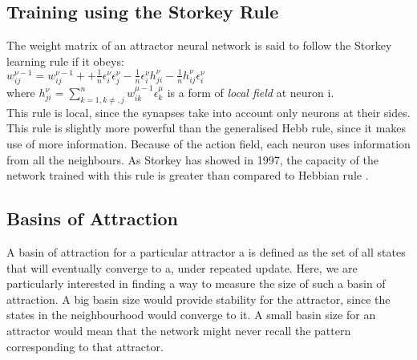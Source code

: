 \subsection{Training using the Storkey Rule}

The weight matrix of an attractor neural network is said to follow the Storkey learning rule if it obeys:\\

\( w_{ij}^{\nu-1} = w_{ij}^{\nu-1}+
		    +\frac{1}{n}\epsilon_{i}^{\nu} \epsilon_{j}^{\nu} 
		    -\frac{1}{n}\epsilon_{i}^{\nu} h_{ji}^{\nu}
		    -\frac{1}{n}h_{ij}^{\nu} \epsilon_{i}^{\nu}
		    \)\\ 

where \( h_{ji}^{\nu} = \sum_{k=1,k\neq,j}^{n} w_{ik}^{\mu-1}\epsilon_{k}^{\mu} \) is a form of \emph{local field} \cite{storkey1997increasing} at neuron i.\\ 
		    
This rule is local, since the synapses take into account only neurons at their sides. This rule is slightly more powerful than the generalised Hebb rule, since it makes use of more information. Because of the action field, each neuron uses information from all the neighbours. As Storkey has showed in 1997, the capacity of the network trained with this rule is greater than compared to Hebbian rule \cite{storkey1997increasing}.


\subsection{Basins of Attraction}

A basin of attraction for a particular attractor a is defined as the set of all states that will eventually converge to a, under repeated update. Here, we are particularly interested in finding a way to measure the size of such a basin of attraction. A big basin size would provide stability for the attractor, since the states in the neighbourhood would converge to it. A small basin size for an attractor would mean that the network might never recall the pattern corresponding to that attractor. 


